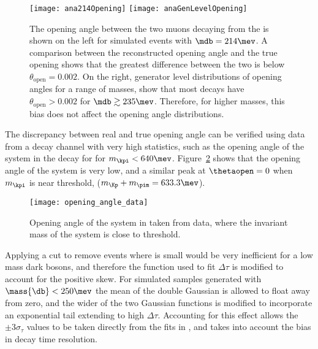 \begin{figure}
  \begin{center}
    \texttt{[image: ana214Opening]}
    \texttt{[image: anaGenLevelOpening]}\\
  \end{center}
  \caption[Opening angle for low mass dark bosons]
  {
    The opening angle between the two muons decaying from the \db is shown on the left for
    simulated events with $\mdb=214\mev$.
    A comparison between the reconstructed opening angle and the true opening shows that
    the greatest difference between the two is below $\theta_\mathrm{open}=0.002$.
    On the right,
    generator level distributions of opening angles for a range of masses,
    show that most \db decays have $\theta_\mathrm{open}>0.002$ for
    $\mdb\gtrsim235\mev$.
    Therefore, for higher masses, this bias does not affect the opening angle distributions.
  }
  \label{fig:opening:gen}
\end{figure}

The discrepancy between real and true opening angle can be verified using data
from a decay channel with very high statistics, such as the opening angle of the \kpi system in
the decay \decay{\Bd}{\kpi\mumu} for for $m_{\kpi}<640\mev$.
Figure~\ref{fig:db:openkpi} shows that the opening angle of the \kpi system
is very low, and a similar peak at $\thetaopen=0$ when $m_{\kpi}$ is near threshold,
($m_{\Kp} + m_{\pim} = 633.3\mev$).

\begin{figure}
  \begin{center}
    \texttt{[image: opening\_angle\_data]}
    \caption[Opening angle of the \kpi system close to threshold]
    {
      Opening angle of the \kpi system in \decay{\Bd}{\kpi\mumu} taken from data, where the invariant mass of the
      \kpi system is close to threshold.
    }
    \label{fig:db:openkpi}
  \end{center}
\end{figure}

Applying a cut to remove events where \thetaopen is small would be very inefficient for a low mass
dark bosons, and therefore the function used to fit $\Delta\tau$ is modified to account for the positive
skew.
For simulated samples generated with $\mass{\db}<250\mev$ the mean of the double Gaussian is
allowed to float away from zero, and the wider of the two Gaussian functions
is modified to incorporate an exponential tail
extending to high $\Delta\tau$.
Accounting for this effect allows the $\pm3\sigma_\tau$ values to be taken directly from the fits
in , and takes into account the bias in decay time resolution.

